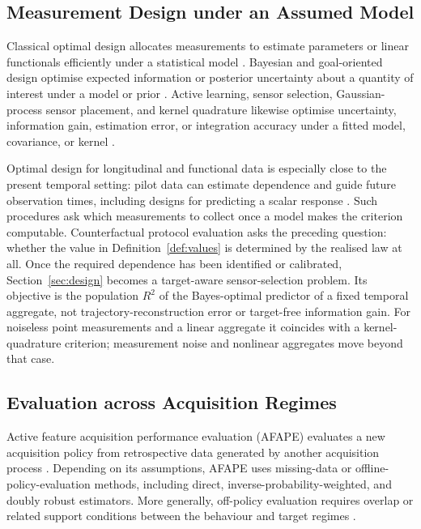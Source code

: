 \subsection{Measurement Design under an Assumed Model}
\label{sec:rw-design}

Classical optimal design allocates measurements to estimate parameters or
linear functionals efficiently under a statistical model
\citep{elfving1952optimum,pukelsheim2006optimal}. Bayesian and goal-oriented
design optimise expected information or posterior uncertainty about a
quantity of interest under a model or prior
\citep{lindley1956information,chaloner1995bayesian,attia2018goal,
alexanderian2021optimal,rainforth2024modern}. Active learning, sensor
selection, Gaussian-process sensor placement, and kernel quadrature likewise
optimise uncertainty, information gain, estimation error, or integration
accuracy under a fitted model, covariance, or kernel
\citep{mackay1992information,settles2012active,joshi2009sensor,
krause2008near,bach2017equivalence,briol2019probabilistic}.

Optimal design for longitudinal and functional data is especially close to the
present temporal setting: pilot data can estimate dependence and guide future
observation times, including designs for predicting a scalar response
\citep{ji2017optimal}. Such procedures ask which measurements to collect once
a model makes the criterion computable. Counterfactual protocol evaluation
asks the preceding question: whether the value in
Definition~\ref{def:values} is determined by the realised law at all. Once the
required dependence has been identified or calibrated, Section~\ref{sec:design}
becomes a target-aware sensor-selection problem. Its objective is the
population $R^2$ of the Bayes-optimal predictor of a fixed temporal aggregate,
not trajectory-reconstruction error or target-free information gain. For
noiseless point measurements and a linear aggregate it coincides with a
kernel-quadrature criterion; measurement noise and nonlinear aggregates move
beyond that case.

\subsection{Evaluation across Acquisition Regimes}
\label{sec:rw-evaluation}

Active feature acquisition performance evaluation (AFAPE) evaluates a new
acquisition policy from retrospective data generated by another acquisition
process \citep{vonkleist2025evaluation}. Depending on its assumptions, AFAPE
uses missing-data or offline-policy-evaluation methods, including direct,
inverse-probability-weighted, and doubly robust estimators. More generally,
off-policy evaluation requires overlap or related support conditions between
the behaviour and target regimes
\citep{precup2000eligibility,kallus2020double,sachdeva2020deficient}.

